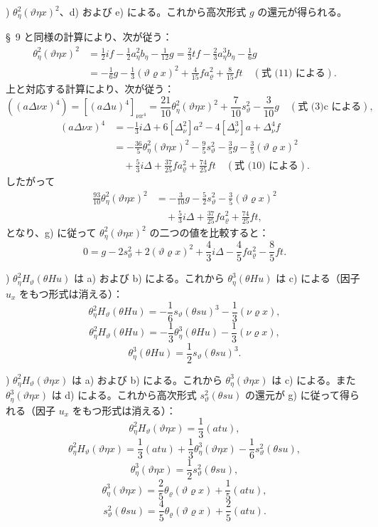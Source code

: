 \documentclass[11pt]{article}
\newcommand{\A}{\Delta}
\newcommand{\R}{\varrho}
\begin{document}
) $\theta_\eta^2(\vartheta\eta x)^2$、d) および e) による。これから高次形式 $g$ の還元が得られる。

\S\ 9 と同様の計算により、次が従う：
\[
\begin{aligned}
\theta_\eta^2(\vartheta\eta x)^2
&=\frac12 i f-\frac12a_\eta^2b_\eta-\frac1{12}g
=\frac23tf-\frac23a_\eta^3b_\eta-\frac16g\\
&=-\frac16g-\frac13(\vartheta\R x)^2+\frac4{15}fa_\R^2+\frac8{15}ft
\quad(\text{式 (11) による}).
\end{aligned}
\]
上と対応する計算により、次が従う：
\[
((a\A\nu x)^4)=[(a\A u)^4]_{\nu x^4}
=\frac{21}{10}\theta_\eta^2(\vartheta\eta x)^2+\frac7{10}s_\vartheta^2-\frac3{10}g
\quad(\text{式 (3)c による}),
\]
\[
\begin{aligned}
(a\A\nu x)^4&=-\frac13i\A+6[\A_\nu^2]a^2-4[\A_\nu^3]a+\A_\nu^4f\\
&= -\frac{36}{5}\theta_\eta^2(\vartheta\eta x)^2-\frac95s_\vartheta^2-\frac35g-\frac35(\vartheta\R x)^2\\
&\quad+\frac53i\A+\frac{37}{25}fa_\R^2+\frac{74}{25}ft\quad(\text{式 (10) による}).
\end{aligned}
\]
したがって
\[
\begin{aligned}
\frac{93}{10}\theta_\eta^2(\vartheta\eta x)^2
&=-\frac3{10}g-\frac52s_\vartheta^2-\frac35(\vartheta\R x)^2\\
&\quad+\frac53i\A+\frac{37}{25}fa_\R^2+\frac{74}{25}ft,
\end{aligned}
\]
となり、g) に従って $\theta_\eta^2(\vartheta\eta x)^2$ の二つの値を比較すると：
\[
\tag{13}
0=g-2s_\vartheta^2+2(\vartheta\R x)^2+\frac43i\A-\frac45fa_\R^2-\frac85ft.
\]

) $\theta_\eta^2H_\vartheta(\theta Hu)$ は a) および b) による。これから $\theta_\eta^3(\theta Hu)$ は c) による（因子 $u_x$ をもつ形式は消える）：
\[
\theta_\eta^2H_\vartheta(\theta Hu)=-\frac16s_\vartheta(\theta su)^3-\frac13(\nu\R x),
\]
\[
\theta_\eta^2H_\vartheta(\theta Hu)=-\frac13\theta_\eta^3(\theta Hu)-\frac13(\nu\R x),
\]
\[
\theta_\eta^3(\theta Hu)=\frac12s_\vartheta(\theta su)^3.
\]

) $\theta_\eta^2H_\vartheta(\vartheta\eta x)$ は a) および b) による。これから $\theta_\eta^3(\vartheta\eta x)$ は c) による。また $\theta_\eta^3(\vartheta\eta x)$ は d) による。これから高次形式 $s_\vartheta^2(\theta su)$ の還元が g) に従って得られる（因子 $u_x$ をもつ形式は消える）：
\[
\theta_\eta^2H_\vartheta(\vartheta\eta x)=\frac13(atu),
\]
\[
\theta_\eta^2H_\vartheta(\vartheta\eta x)=\frac13(atu)+\frac13\theta_\eta^3(\vartheta\eta x)-\frac16s_\vartheta^2(\theta su),
\]
\[
\theta_\eta^3(\vartheta\eta x)=\frac12s_\vartheta^2(\theta su),
\]
\[
\theta_\eta^3(\vartheta\eta x)=\frac25\theta_\R(\vartheta\R x)+\frac15(atu),
\]
\[
\tag{14}
s_\vartheta^2(\theta su)=\frac45\theta_\R(\vartheta\R x)+\frac25(atu).
\]
\end{document}
